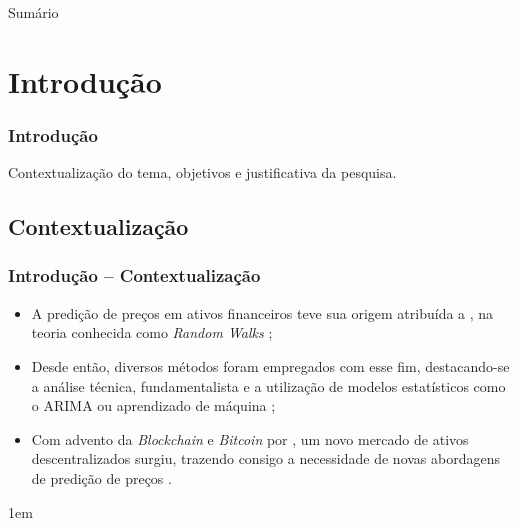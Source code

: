 \documentclass[aspectratio=169]{beamer}
\begin{document}
\begin{frame}
  \titlepage
\end{frame}


\begin{frame}[fragile]{Sumário}
  \tableofcontents
\end{frame}


\section{Introdução}

\begin{frame} \frametitle{Introdução}
	\begin{center}
		Contextualização do tema, objetivos e justificativa da pesquisa.
	\end{center}
\end{frame}


\subsection{Contextualização}

\begin{frame}[fragile] \frametitle{Introdução -- Contextualização}
	\begin{itemize} \itemsep1em
	\item 	A predição de preços em ativos financeiros teve sua origem atribuída a \textcite{Bachelier}, na teoria conhecida como \textit{Random Walks} \cite{Fama1965,Fama};
		
	\item 	Desde então, diversos métodos foram empregados com esse fim, destacando-se a análise técnica, fundamentalista e a utilização de modelos estatísticos como o ARIMA \cite{Ariyo} ou aprendizado de máquina \cite{Fer};
		
	\item 	Com advento da \textit{Blockchain} e \textit{Bitcoin} por \cite{Nakamoto}, um novo mercado de ativos descentralizados surgiu, trazendo consigo a necessidade de novas abordagens de predição de preços \cite{Zhang}.
	\end{itemize} \itemsep1em
\end{frame}
\end{document}
